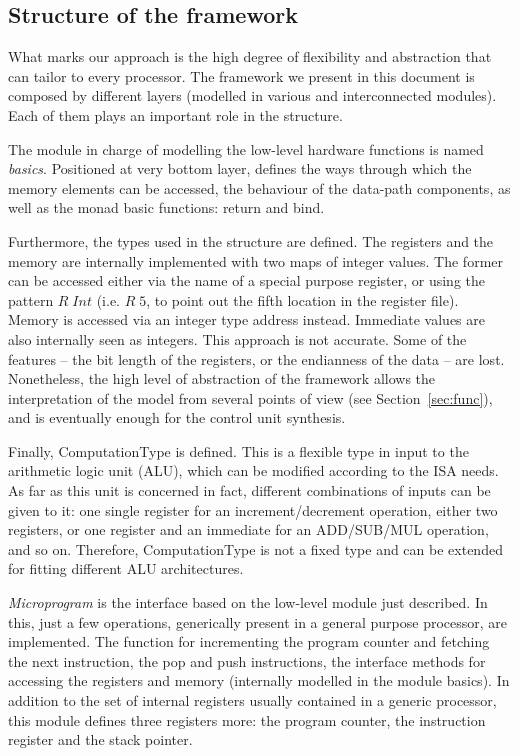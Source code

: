 \documentclass[conference]{IEEEtran}
\begin{document}
\subsection{Structure of the framework}
\label{sec:struct}
What marks our approach is the high degree of flexibility and abstraction that can
tailor to every processor. The framework we present in this document is composed
by different layers (modelled in various and interconnected modules). Each of them plays 
an important role in the structure.

The module in charge of modelling the low-level hardware functions is named
\textit{basics}. Positioned at very bottom layer, defines the ways through which the
memory elements can be accessed, the behaviour of the data-path components, 
as well as the monad basic functions: return and bind.

Furthermore, the types used in the structure are defined.
The registers and the memory are internally implemented with two maps of integer values.
The former can be accessed either via the name of a
special purpose register, or using the pattern $R \; Int$ (i.e. $R \; 5$, to point out the
fifth location in the register file). Memory is accessed via an integer type address instead.
Immediate values are also internally seen as integers. This approach is not
accurate. Some of the features -- the bit length of the registers, or the
endianness of the data -- are lost. Nonetheless, the high level of abstraction of
the framework allows the interpretation of the model from several points of view (see
Section~\ref{sec:func}), and is eventually enough for the control unit synthesis.

Finally, ComputationType is defined. This is a flexible type in input to the
arithmetic logic unit (ALU), which can be modified according to the ISA
needs. As far as this unit is concerned in fact, different combinations of inputs can be
given to it: one single register for an increment/decrement operation, either two 
registers, or one register and an immediate for an ADD/SUB/MUL operation, and so on.
Therefore, ComputationType is not a fixed type and can be extended for fitting different
ALU architectures.

\textit{Microprogram} is the interface based on the low-level module just described.
In this, just a few operations, generically present in a general purpose processor, are
implemented. The function for incrementing the program counter and fetching
the next instruction, the pop and push instructions, the interface methods for accessing
the registers and memory (internally modelled in the module basics).
In addition to the set of internal registers usually contained in a generic processor,
this module defines three registers more: the program counter, the instruction register and
the stack pointer.
\end{document}
